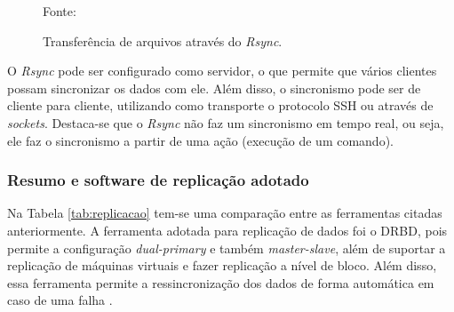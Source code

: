 \begin{figure}[h!]
 \centering
 \caption{Transferência de arquivos através do \textit{Rsync}.}
 Fonte: \citet{lopez2012}
 \label{fig:rsync}
\end{figure}


O \textit{Rsync} pode ser configurado como servidor, o que permite que vários clientes possam sincronizar os dados com ele. 
Além disso, o sincronismo pode ser de cliente para cliente, utilizando como transporte o protocolo \ac{SSH} ou através de \textit{sockets}.
Destaca-se que o \textit{Rsync} não faz um sincronismo em tempo real, ou seja, ele faz o sincronismo a partir de uma ação (execução de um comando).


\subsubsection{Resumo e software de replicação adotado}
\label{section:replicacaoescolhido}

Na Tabela \ref{tab:replicacao} tem-se uma comparação entre as ferramentas citadas anteriormente. 
A ferramenta adotada para replicação de dados foi o \ac{DRBD}, pois permite a configuração \textit{dual-primary} e também \textit{master-slave}, 
além de suportar a replicação de máquinas virtuais e fazer replicação a nível de bloco. Além disso, essa ferramenta permite a ressincronização 
dos dados de forma automática em caso de uma falha \cite{drbd}.

